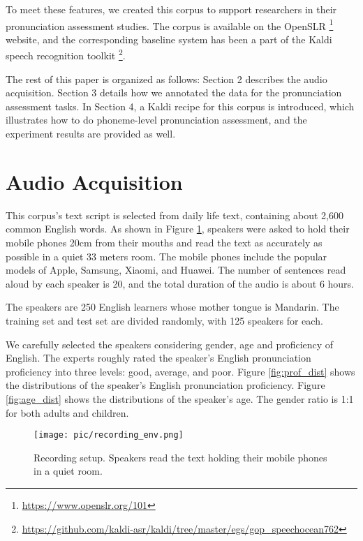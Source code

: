 \documentclass[a4paper]{article}
\begin{document}
To meet these features, we created this corpus to support researchers in their pronunciation assessment studies.
The corpus is available on the OpenSLR \footnote{\url{https://www.openslr.org/101}} website, and the corresponding baseline system has been a part of the Kaldi speech recognition toolkit \footnote{\url{https://github.com/kaldi-asr/kaldi/tree/master/egs/gop\_speechocean762}}.

The rest of this paper is organized as follows: Section 2 describes the audio acquisition. Section 3 details how we annotated the data for the pronunciation assessment tasks. In Section 4, a Kaldi recipe for this corpus is introduced, which illustrates how to do phoneme-level pronunciation assessment, and the experiment results are provided as well.

\section{Audio Acquisition}
\label{sec:audio}

This corpus's text script is selected from daily life text, containing about 2,600 common English words. As shown in Figure \ref{fig:recording}, speakers were asked to hold their mobile phones 20cm from their mouths and read the text as accurately as possible in a quiet 33 meters room. The mobile phones include the popular models of Apple, Samsung, Xiaomi, and Huawei. The number of sentences read aloud by each speaker is 20, and the total duration of the audio is about 6 hours.

The speakers are 250 English learners whose mother tongue is Mandarin.
The training set and test set are divided randomly, with 125 speakers for each.

We carefully selected the speakers considering gender, age and proficiency of English.
The experts roughly rated the speaker's English pronunciation proficiency into three levels: good, average, and poor.
Figure \ref{fig:prof_dist} shows the distributions of the speaker's English pronunciation proficiency. 
Figure \ref{fig:age_dist} shows the distributions of the speaker's age. 
The gender ratio is 1:1 for both adults and children.

\begin{figure}[t]
  \centering
  \texttt{[image: pic/recording\_env.png]}
  \caption{Recording setup. Speakers read the text holding their mobile phones in a quiet room.}
  \label{fig:recording}
\end{figure}
\end{document}
